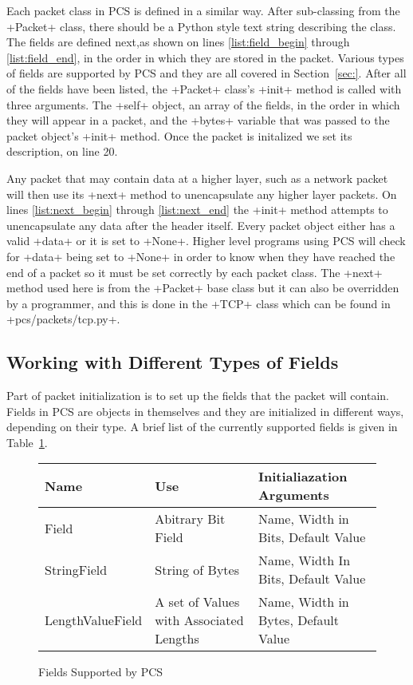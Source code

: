 \documentclass[11pt]{article}
\begin{document}
Each packet class in PCS is defined in a similar way.  After
sub-classing from the \class+Packet+ class, there should be a Python
style text string describing the class.  The fields are defined
next,as shown on lines \ref{list:field_begin} through
\ref{list:field_end}, in the order in which they are stored in the
packet.  Various types of fields are supported by PCS and they are all
covered in Section~\ref{sec:}.  After all of the fields have been
listed, the \class+Packet+ class's \method+init+ method is called with
three arguments.  The \class+self+ object, an array of the fields, in
the order in which they will appear in a packet, and the \field+bytes+
variable that was passed to the packet object's \method+init+ method.
Once the packet is initalized we set its description, on line 20.

Any packet that may contain data at a higher layer, such as a network
packet will then use its \method+next+ method to unencapsulate any
higher layer packets.  On lines \ref{list:next_begin} through
\ref{list:next_end} the \method+init+ method attempts to unencapsulate
any data after the header itself.  Every packet object either has a
valid \field+data+ or it is set to \constant+None+.  Higher level
programs using PCS will check for \field+data+ being set to
\variable+None+ in order to know when they have reached the end of a
packet so it must be set correctly by each packet class.  The
\method+next+ method used here is from the \class+Packet+ base class
but it can also be overridden by a programmer, and this is done in the
\class+TCP+ class which can be found in \file+pcs/packets/tcp.py+.

\subsection{Working with Different Types of Fields}
\label{sec:working_with_different_types_of_fields}

Part of packet initialization is to set up the fields that the packet
will contain.  Fields in PCS are objects in themselves and they are
initialized in different ways, depending on their type.  A brief list
of the currently supported fields is given in
Table~\ref{fig:fields_supported_by_pcs}.

\begin{figure}
  \centering
  \begin{tabular}{|l|l|l|}
    \hline
    Name & Use & Initialiazation Arguments\\
    \hline
    Field & Abitrary Bit Field & Name, Width in Bits, Default Value\\
    \hline
    StringField & String of Bytes & Name, Width In Bits, Default Value\\
    \hline
    LengthValueField & A set of Values with Associated Lengths & Name,
    Width in Bytes, Default Value\\
    \hline
  \end{tabular}
  \caption{Fields Supported by PCS}
  \label{fig:fields_supported_by_pcs}
\end{figure}
\end{document}
